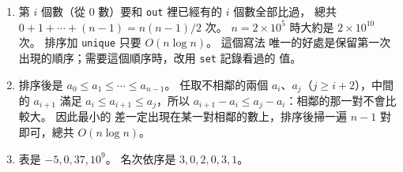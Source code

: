 \begin{enumerate}
\item 第 $i$ 個數（從 $0$ 數）要和 \texttt{out} 裡已經有的 $i$ 個數全部比過，
總共 $0 + 1 + \cdots + (n - 1) = n(n-1)/2$ 次。 $n = 2 \times 10^5$ 時大約是
$2 \times 10^{10}$ 次。 排序加 \texttt{unique} 只要 $O(n \log n)$。 這個寫法
唯一的好處是保留第一次出現的順序；需要這個順序時，改用 \texttt{set} 記錄看過的
值。

\item 排序後是 $a_0 \le a_1 \le \cdots \le a_{n-1}$。 任取不相鄰的兩個
$a_i$、$a_j$（$j \ge i + 2$），中間的 $a_{i+1}$ 滿足 $a_i \le a_{i+1} \le
a_j$，所以 $a_{i+1} - a_i \le a_j - a_i$：相鄰的那一對不會比較大。 因此最小的
差一定出現在某一對相鄰的數上，排序後掃一遍 $n - 1$ 對即可，總共
$O(n \log n)$。

\item 表是 $-5, 0, 37, 10^9$。 名次依序是 $3, 0, 2, 0, 3, 1$。
\end{enumerate}
